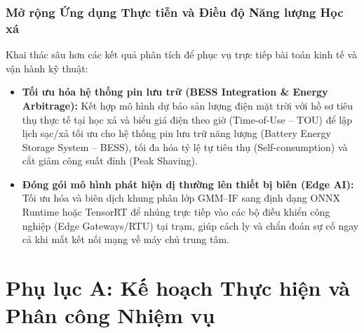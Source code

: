 \documentclass[12pt, a4paper]{report}
\begin{document}
\subsection{Mở rộng Ứng dụng Thực tiễn và Điều độ Năng lượng Học xá}
\label{subsec:future_applications}
Khai thác sâu hơn các kết quả phân tích để phục vụ trực tiếp bài toán kinh tế và vận hành kỹ thuật:
\begin{itemize}
    \item \textbf{Tối ưu hóa hệ thống pin lưu trữ (BESS Integration \& Energy Arbitrage):} Kết hợp mô hình dự báo sản lượng điện mặt trời với hồ sơ tiêu thụ thực tế tại học xá và biểu giá điện theo giờ (Time-of-Use -- TOU) để lập lịch sạc/xả tối ưu cho hệ thống pin lưu trữ năng lượng (Battery Energy Storage System -- BESS), tối đa hóa tỷ lệ tự tiêu thụ (Self-consumption) và cắt giảm công suất đỉnh (Peak Shaving).
    \item \textbf{Đóng gói mô hình phát hiện dị thường lên thiết bị biên (Edge AI):} Tối ưu hóa và biên dịch khung phân lớp GMM--IF sang định dạng ONNX Runtime hoặc TensorRT để nhúng trực tiếp vào các bộ điều khiển công nghiệp (Edge Gateways/RTU) tại trạm, giúp cách ly và chẩn đoán sự cố ngay cả khi mất kết nối mạng về máy chủ trung tâm.
\end{itemize}
\chapter*{Phụ lục A: Kế hoạch Thực hiện và Phân công Nhiệm vụ}
\label{app:kehoach}
\end{document}
